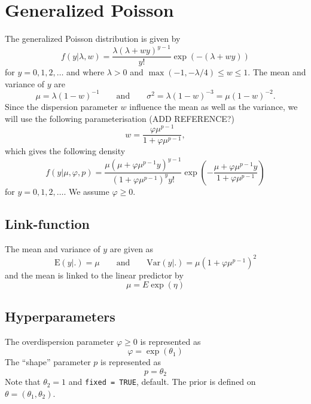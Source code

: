 \documentclass[a4paper,11pt]{article}
\begin{document}
\section*{Generalized Poisson}

The generalized Poisson distribution is given by
\begin{displaymath}
    f(y|\lambda,w) = \frac{\lambda(\lambda+wy)^{y-1}}{y!}
    \exp(-(\lambda+wy))
\end{displaymath}
for $y=0, 1, 2, \ldots$ and where $\lambda>0$ and
$\max(-1,-\lambda/4)\leq w\leq 1$. The mean and variance of $y$ are
\begin{displaymath}
    \mu =\lambda(1-w)^{-1} \qquad\text{and}\qquad
    \sigma^{2} = \lambda(1-w)^{-3}= \mu(1-w)^{-2}.
\end{displaymath}
Since the dispersion parameter $w$ influence the mean as well as the
variance, we will use the following parameterisation (ADD REFERENCE?)
\begin{displaymath}
    w=\frac{\varphi\mu^{p-1}}{1+\varphi\mu^{p-1}}, 
\end{displaymath}
which gives the following density
\begin{displaymath} 
    f(y|\mu,\varphi,p) =\frac{ \mu(\mu+\varphi\mu^{p-1} y)^{y-1}}%
    {(1+\varphi\mu^{p-1})^{y}y!}
    \exp\left(-\frac{\mu+\varphi\mu^{p-1} y}{1+\varphi\mu^{p-1}}\right)
\end{displaymath}
for $y=0, 1, 2, \ldots$. We assume $\varphi \ge 0$.

\subsection*{Link-function}

The mean and variance of $y$ are given as
\begin{displaymath}
    \text{E}(y|.) = \mu \qquad\text{and}\qquad
    \text{Var}(y|.) = \mu\left(1+\varphi\mu^{p-1}\right)^{2}
\end{displaymath}
and the mean is linked to the linear predictor by
\begin{displaymath}
    \mu = E \exp(\eta)
\end{displaymath}

\subsection*{Hyperparameters}

The overdispersion parameter $\varphi \ge 0$ is represented as
\begin{displaymath}
    \varphi = \exp(\theta_{1}) 
\end{displaymath}
The ``shape'' parameter $p$ is represented as
\begin{displaymath}
    p = \theta_{2}
\end{displaymath}
Note that $\theta_{2}=1$ and \texttt{fixed = TRUE}, default. The
prior is defined on ${\theta}=(\theta_1,\theta_2)$.
\end{document}
